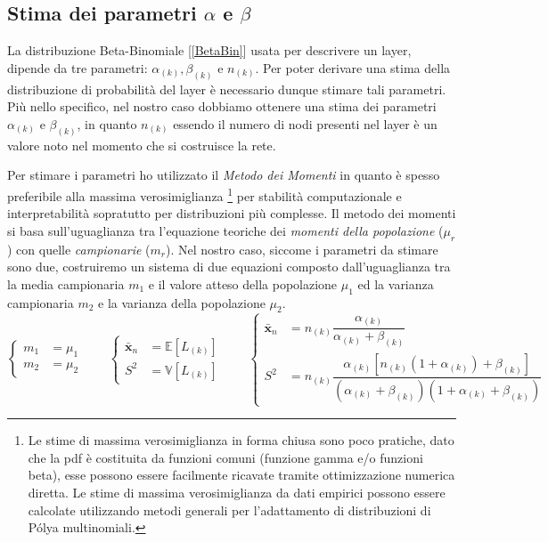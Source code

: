 \documentclass[10pt]{article} %
\begin{document}
\subsection{Stima dei parametri $\alpha$ e $\beta$}
La distribuzione Beta-Binomiale [\ref{BetaBin}] usata per descrivere un layer, dipende da tre parametri: $\alpha_{(k)}, \beta_{(k)}$ e $n_{(k)}$. Per poter derivare una stima della distribuzione di probabilità del layer è necessario dunque stimare tali parametri. Più nello specifico, nel nostro caso dobbiamo ottenere una stima dei parametri $\alpha_{(k)}$ e $\beta_{(k)}$, in quanto $n_{(k)}$ essendo il numero di nodi presenti nel layer è un valore noto nel momento che si costruisce la rete.

Per stimare i parametri ho utilizzato il \textit{Metodo dei Momenti} in quanto è spesso preferibile alla massima verosimiglianza \footnote{Le stime di massima verosimiglianza in forma chiusa sono poco pratiche, dato che la pdf è costituita da funzioni comuni (funzione gamma e/o funzioni beta), esse possono essere facilmente ricavate tramite ottimizzazione numerica diretta. Le stime di massima verosimiglianza da dati empirici possono essere calcolate utilizzando metodi generali per l'adattamento di distribuzioni di Pólya multinomiali.} per stabilità computazionale e interpretabilità sopratutto per distribuzioni più complesse. Il metodo dei momenti si basa sull'uguaglianza tra l'equazione teoriche dei \textit{momenti della popolazione} ($\mu_{r}$) con quelle \textit{campionarie} ($m_{r}$). Nel nostro caso, siccome i parametri da stimare sono due, costruiremo un sistema di due equazioni composto dall'uguaglianza tra la media campionaria $m_{1}$ e il valore atteso della popolazione $\mu_{1}$ ed la varianza campionaria $m_{2}$ e la varianza della popolazione $\mu_{2}$.
\begin{equation}
    \begin{cases}
        m_{1} &= \mu_{1}\\
        m_{2} &= \mu_{2}
    \end{cases} \qquad
    \begin{cases}
        \bar{\mathbf{x}}_{n} &= \mathbb{E}[L_{(k)}]\\
        S^{2} &= \mathbb{V}[L_{(k)}]
    \end{cases} \qquad
    \begin{cases}
        \bar{\mathbf{x}}_{n} &= n_{(k)}\dfrac{\alpha_{(k)}}{\alpha_{(k)}+\beta_{(k)}}\\
        S^{2} &= n_{(k)}\dfrac{\alpha_{(k)}[n_{(k)}(1+\alpha_{(k)})+\beta_{(k)}]}{(\alpha_{(k)}+\beta_{(k)})(1+\alpha_{(k)}+\beta_{(k)})}
    \end{cases}
\end{equation}
\end{document}
